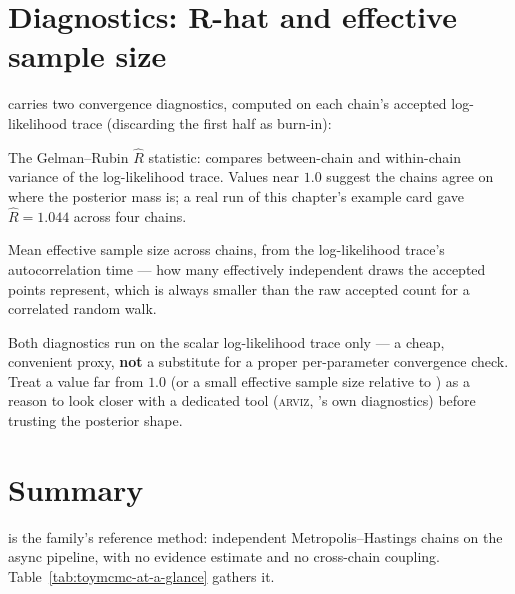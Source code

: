 \section{Diagnostics: R-hat and effective sample size}
\label{sec:mcmc-diagnostics}

 carries two convergence diagnostics, computed on each
chain's accepted log-likelihood trace (discarding the first half as burn-in):

\begin{keylist}
  \item[rhat\_logl] The Gelman--Rubin $\hat{R}$ statistic\cite{GelmanRubin:1992}:
        compares between-chain and
        within-chain variance of the log-likelihood trace. Values near $1.0$ suggest
        the chains agree on where the posterior mass is; a real run of this chapter's
        example card gave $\hat{R}=1.044$ across four chains.
  \item[ess\_logl\_mean] Mean effective sample size across chains, from the
        log-likelihood trace's autocorrelation time --- how many effectively
        independent draws the accepted points represent, which is always smaller than
        the raw accepted count for a correlated random walk.
\end{keylist}

\begin{jwarn}
Both diagnostics run on the scalar log-likelihood trace only --- a cheap, convenient
proxy, \textbf{not} a substitute for a proper per-parameter convergence check. Treat a
value far from $1.0$ (or a small effective sample size relative to
) as a reason to look closer with a dedicated tool
(\textsc{arviz}, 's own diagnostics) before trusting the posterior shape.
\end{jwarn}

\section{Summary}
\label{sec:toymcmc-summary}

 is the family's reference method: independent Metropolis--Hastings
chains on the async pipeline, with no evidence estimate and no cross-chain coupling.
Table~\ref{tab:toymcmc-at-a-glance} gathers it.

